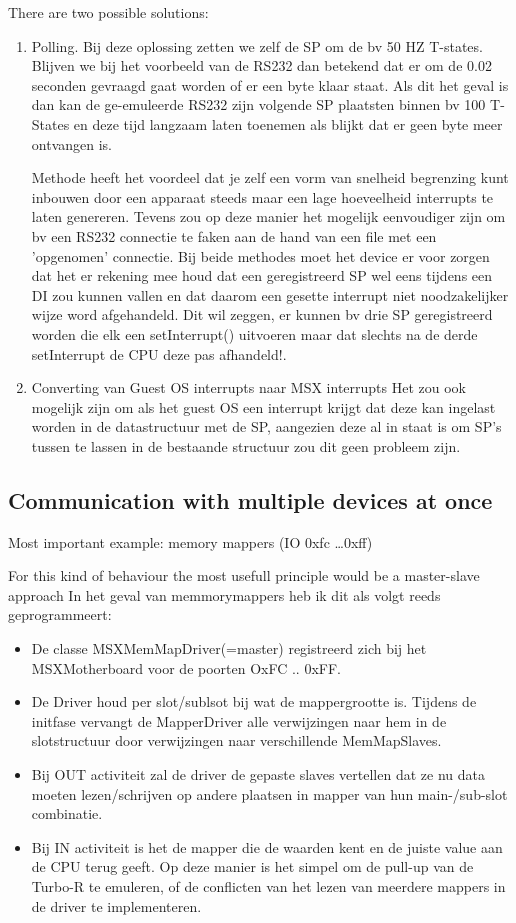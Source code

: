 \documentclass[11pt, a4paper]{report}
\begin{document}
There are two possible solutions:
\label{unpredic-irq}
\begin{enumerate}
\item Polling.
Bij deze oplossing zetten we zelf de SP om de bv 50 HZ T-states.
Blijven we bij het voorbeeld van de RS232 dan betekend dat er om de 0.02 seconden
gevraagd gaat worden of er een byte klaar staat. Als dit het geval is dan kan de
ge-emuleerde RS232 zijn volgende SP plaatsten binnen bv 100 T-States en deze tijd
langzaam laten toenemen als blijkt dat er geen byte meer ontvangen is.

Methode heeft het voordeel dat je zelf een vorm van snelheid begrenzing kunt
inbouwen door een apparaat steeds maar een lage hoeveelheid interrupts te laten
genereren. Tevens zou op deze manier het mogelijk eenvoudiger zijn om bv een
RS232 connectie te faken aan de hand van een file met een 'opgenomen' connectie.
Bij beide methodes moet het device er voor zorgen dat het er rekening mee houd
dat een geregistreerd SP wel eens tijdens een DI zou kunnen vallen en dat daarom
een gesette interrupt niet noodzakelijker wijze word afgehandeld. Dit wil
zeggen, er kunnen bv drie SP geregistreerd worden die elk een setInterrupt()
uitvoeren maar dat slechts na de derde setInterrupt de CPU deze pas afhandeld!.

\item Converting van Guest OS interrupts naar MSX interrupts
Het zou ook mogelijk zijn om als het guest OS een interrupt krijgt dat deze kan
ingelast worden in de datastructuur met de SP, aangezien deze al in staat is om
SP's tussen te lassen in de bestaande structuur zou dit geen probleem zijn.
\end{enumerate}


\subsection{Communication with multiple devices at once}

Most important example: memory mappers (IO 0xfc \ldots 0xff)

For this kind of behaviour the most usefull principle would be a master-slave approach
In het geval van memmorymappers heb ik dit als volgt reeds geprogrammeert:
\begin{itemize}
\item De classe MSXMemMapDriver(=master) registreerd zich bij het MSXMotherboard voor de
poorten OxFC .. 0xFF.
\item De Driver houd per slot/sublsot bij wat de mappergrootte is. Tijdens de initfase
vervangt de MapperDriver alle verwijzingen naar hem in de slotstructuur door verwijzingen
naar verschillende MemMapSlaves.
\item Bij OUT activiteit zal de driver de gepaste slaves vertellen dat ze nu data moeten
lezen/schrijven op andere plaatsen in mapper van hun main-/sub-slot combinatie.
\item Bij IN activiteit is het de mapper die de waarden kent en de juiste value aan de
CPU terug geeft. Op deze manier is het simpel om de pull-up van de Turbo-R te
emuleren, of de conflicten van het lezen van meerdere mappers in de driver te
implementeren.
\end{itemize}
\end{document}
